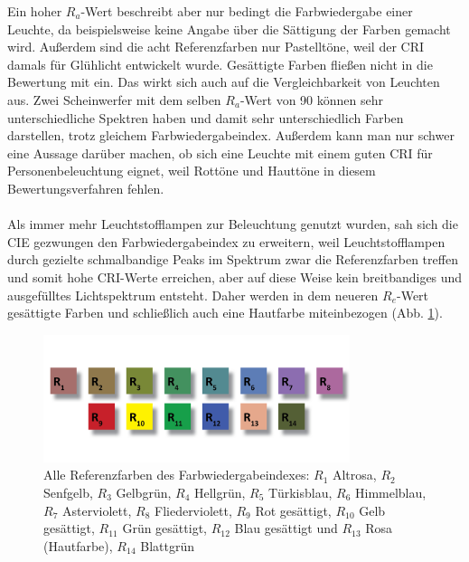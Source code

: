 Ein hoher $R_{a}$-Wert beschreibt aber nur bedingt die Farbwiedergabe einer Leuchte, da beispielsweise keine Angabe über die Sättigung der Farben gemacht wird. Außerdem sind die acht Referenzfarben nur Pastelltöne, weil der CRI damals für Glühlicht entwickelt wurde. Gesättigte Farben fließen nicht in die Bewertung mit ein.
Das wirkt sich auch auf die Vergleichbarkeit von Leuchten aus. Zwei Scheinwerfer mit dem selben $R_{a}$-Wert von 90 können sehr unterschiedliche Spektren haben und damit sehr unterschiedlich Farben darstellen, trotz gleichem Farbwiedergabeindex.
Außerdem kann man nur schwer eine Aussage darüber machen, ob sich eine Leuchte mit einem guten CRI für Personenbeleuchtung eignet, weil Rottöne und Hauttöne in diesem Bewertungsverfahren fehlen.\\\\
Als immer mehr Leuchtstofflampen zur Beleuchtung genutzt wurden, sah sich die CIE gezwungen den Farbwiedergabeindex zu erweitern, weil Leuchtstofflampen durch gezielte schmalbandige Peaks im Spektrum zwar die Referenzfarben treffen und somit hohe CRI-Werte erreichen, aber auf diese Weise kein breitbandiges und ausgefülltes Lichtspektrum entsteht. Daher werden in dem neueren $R_{e}$-Wert gesättigte Farben und schließlich auch eine Hautfarbe miteinbezogen (Abb. \ref{b_cri}).

\begin{figure}[htp]     %
\centering
\includegraphics[width=0.8\textwidth]{bilder/cri} 
\caption {Alle Referenzfarben des Farbwiedergabeindexes: $R_{1}$ Altrosa, $R_{2}$ Senfgelb, $R_{3}$ Gelbgrün, $R_{4}$ Hellgrün, $R_{5}$ Türkisblau, $R_{6}$ Himmelblau, $R_{7}$ Asterviolett, $R_{8}$ Fliederviolett, $R_{9}$ Rot gesättigt, $R_{10}$ Gelb gesättigt, $R_{11}$ Grün gesättigt, $R_{12}$ Blau gesättigt und $R_{13}$ Rosa (Hautfarbe), $R_{14}$ Blattgrün \protect\footnotemark}\label{b_cri}
\end{figure}


